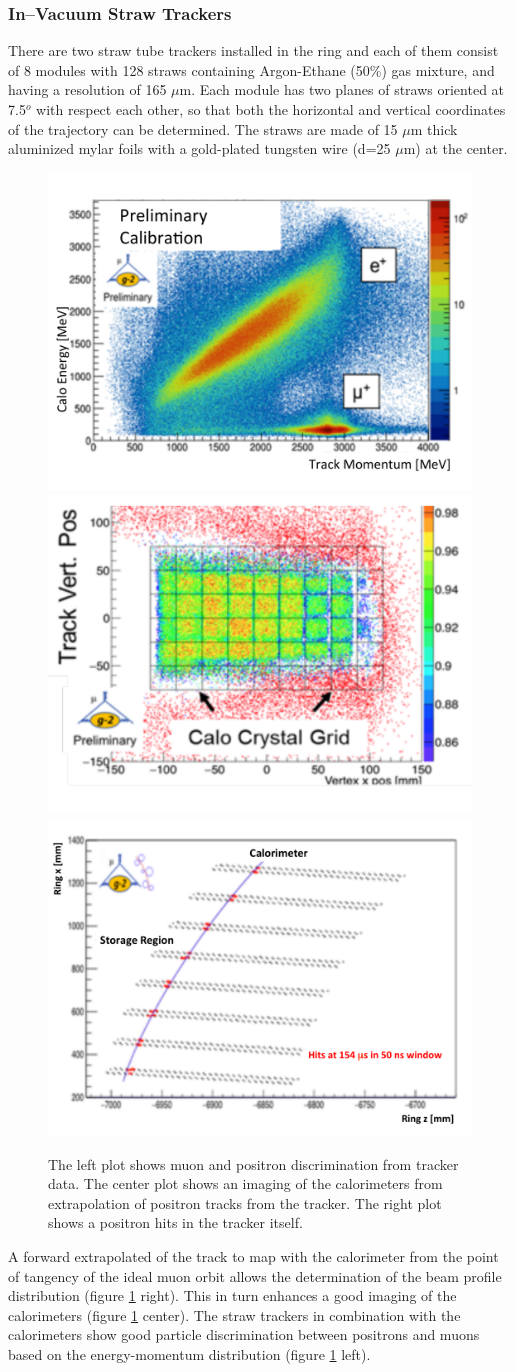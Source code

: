 \documentclass[journal,article,submit,moreauthors,pdftex,10pt,a4paper]{Definitions/mdpi}
\begin{document}
\subsubsection{In–Vacuum Straw Trackers}
There are two straw tube trackers installed in the ring and 
each of them consist of 8 modules with 128 straws containing Argon-Ethane (50\%) gas mixture, 
and having a resolution of 165 $\mu$m. 
Each module has two planes of straws oriented at 7.5$^o$ with respect each other, so that
both the horizontal and vertical coordinates of the trajectory can be determined.
The straws are made of 15 $\mu$m thick aluminized mylar foils with a gold-plated tungsten
wire (d=25 $\mu$m) at the center. 
\begin{figure}[H]
\centering
\includegraphics[width=5 cm]{track_dist.pdf}
\includegraphics[width=5 cm]{calo_track.pdf}
\includegraphics[width=5 cm]{tracker.pdf}
\caption{\label{fig5}The left plot shows muon and positron discrimination from tracker data. 
The center plot shows an imaging of the calorimeters from extrapolation of positron tracks from the 
tracker. The right plot shows a positron hits in the tracker itself.}
\end{figure}  
A forward extrapolated of the track to map with the calorimeter from the
point of tangency of the ideal muon orbit allows the determination of the beam profile distribution 
(figure \ref{fig5} right). This in turn enhances a good imaging of the calorimeters 
(figure \ref{fig5} center). 
The straw trackers in combination with the calorimeters show good particle discrimination 
between positrons and muons based on the energy-momentum distribution (figure \ref{fig5} left).
\end{document}
